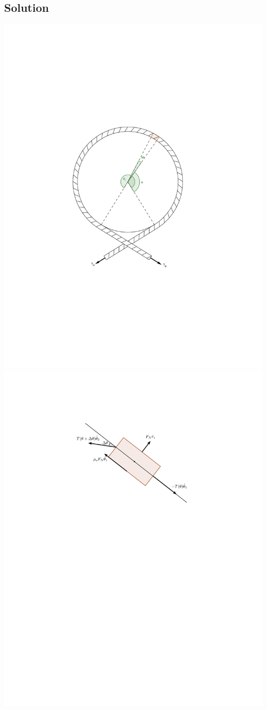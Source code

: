 \documentclass[solutions]{esg8012pset}
\begin{document}
\subsection*{Solution}
  \begin{center} \includegraphics[width=.33\textwidth]{2009-10-02_Diagram_1_1}\includegraphics[width=.5\textwidth]{2009-10-02_Diagram_1_2}\end{center}
\end{document}
